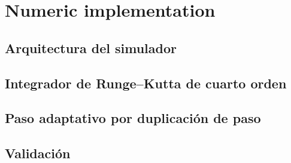 \chapter{Numeric implementation}
\label{cap:numerico}

\section{Arquitectura del simulador}

\section{Integrador de Runge--Kutta de cuarto orden}

\section{Paso adaptativo por duplicación de paso}
\label{sec:adaptativo}

\section{Validación}
